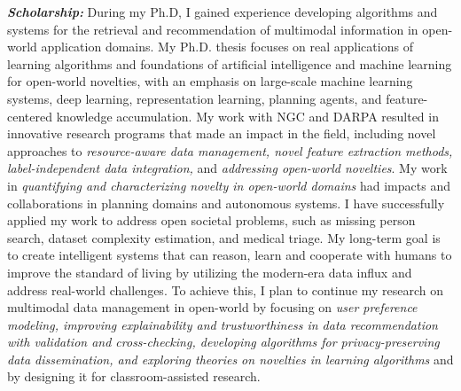 \documentclass[9pt]{article}
\renewcommand*\paragraph[1]{}
\begin{document}
\paragraph{1 and P1) Earned doctoral degree in computer science or a closely related field}
\textbf{\textit{Scholarship:}}
During my Ph.D, I gained experience developing algorithms and systems for the retrieval and recommendation of multimodal information in open-world application domains. My Ph.D. thesis focuses on real applications of learning algorithms and foundations of artificial intelligence and machine learning for open-world novelties, with an emphasis on large-scale machine learning systems, deep learning, representation learning, planning agents, and feature-centered knowledge accumulation. My work with NGC and DARPA resulted in innovative research programs that made an impact in the field, including novel approaches to \textit{resource-aware data management, novel feature extraction methods, label-independent data integration,} and \textit{addressing open-world novelties}. My work in \textit{quantifying and characterizing novelty in open-world domains} had impacts and collaborations in planning domains and autonomous systems. I have successfully applied my work to address open societal problems, such as missing person search, dataset complexity estimation, and medical triage.
%
My long-term goal is to create intelligent systems that can reason, learn and cooperate with humans to improve the standard of living by utilizing the 
modern-era data influx
and address real-world challenges.
To achieve this, I plan to continue my research on multimodal data management in open-world by focusing on \textit{user preference modeling, improving explainability and trustworthiness in data recommendation with validation and cross-checking, developing algorithms for privacy-preserving data dissemination, and exploring theories on novelties in learning algorithms} and by designing it for classroom-assisted research. 
%
\end{document}
